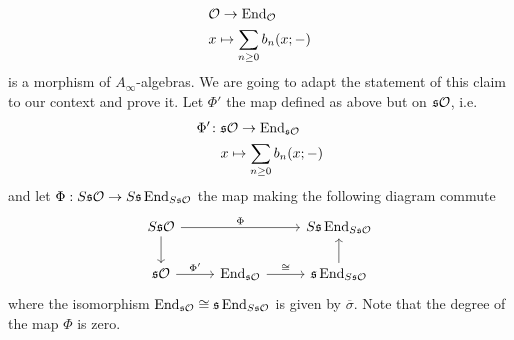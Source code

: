 \documentclass[twoside]{article}
\begin{document}
\begin{align*}
&{\mathcal O} \to \operatorname{End}_{\mathcal O}\\
&x\mapsto \sum_{n\geq 0}b_n(x;-)
\end{align*}
is a morphism of $A_\infty$-algebras. We are going to adapt the statement of this claim to our context and prove it. Let $\Phi'$ the map defined as above but on $\mathfrak{s}{\mathcal O}$, i.e.
\begin{align*}
\Phi'\colon&\mathfrak{s}{\mathcal O} \to \operatorname{End}_{\mathfrak{s}{\mathcal O}}\\
&x\mapsto \sum_{n\geq 0}b_n(x;-)
\end{align*}
and let $\Phi:S\mathfrak{s}{\mathcal O}\to S\mathfrak{s}\operatorname{End}_{S\mathfrak{s}{\mathcal O}}$ the map making the following diagram commute
\[
\begin{tikzcd}
S\s\OO\arrow[rr, "\Phi"]\arrow[d] & & S\s\End_{S\s\OO}\\
\s\OO\arrow[r, "\Phi'"]& \End_{\s\OO}\arrow[r, "\cong"]& \s\End_{S\s\OO}\arrow[u]
\end{tikzcd}
\]
where the isomorphism $\operatorname{End}_{\mathfrak{s}{\mathcal O}}\cong\mathfrak{s}\operatorname{End}_{S\mathfrak{s}{\mathcal O}}$ is given by $\overline{\sigma}$. Note that the degree of the map $\Phi$ is zero.
\end{document}
